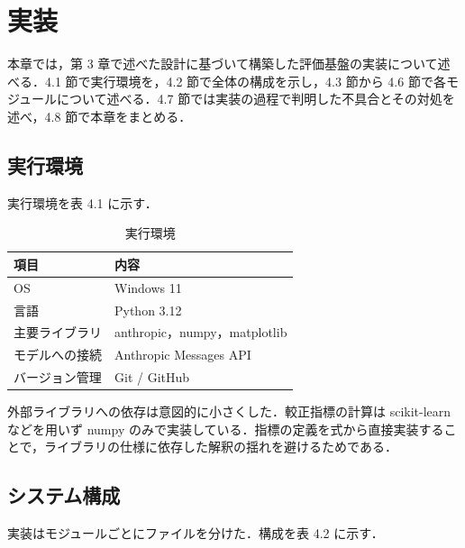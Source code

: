 \section{実装}

本章では，第 3 章で述べた設計に基づいて構築した評価基盤の実装について述べる．4.1 節で実行環境を，4.2 節で全体の構成を示し，4.3 節から 4.6 節で各モジュールについて述べる．4.7 節では実装の過程で判明した不具合とその対処を述べ，4.8 節で本章をまとめる．

\subsection{実行環境}

実行環境を表 4.1 に示す．

\begin{table}[t]
\centering
\small
\caption{実行環境}
\label{tab:4.1}
\begin{tabular}{|l|l|}
\hline
項目 & 内容 \\
\hline
OS & Windows 11 \\
言語 & Python 3.12 \\
主要ライブラリ & anthropic，numpy，matplotlib \\
モデルへの接続 & Anthropic Messages API \\
バージョン管理 & Git / GitHub \\
\hline
\end{tabular}
\end{table}

外部ライブラリへの依存は意図的に小さくした．較正指標の計算は scikit-learnなどを用いず numpy のみで実装している．指標の定義を式から直接実装することで，ライブラリの仕様に依存した解釈の揺れを避けるためである．

\subsection{システム構成}

実装はモジュールごとにファイルを分けた．構成を表 4.2 に示す．

